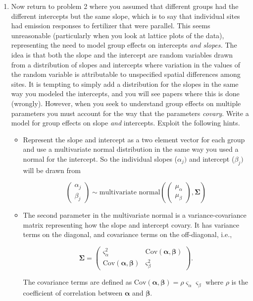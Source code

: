 \documentclass[12pt, oneside]{article}
\begin{document}
\begin{enumerate} [leftmargin=*]
\newpage

\item Now return to problem 2 where you assumed that different groups had the different intercepts but the same slope, which is to say that individual sites had emission responses to fertilizer that were parallel. This seems unreasonable (particularly when you look at lattice plots of the data), representing the need to model group effects on intercepts \emph{and slopes.} The idea is that both the slope and the intercept are random variables drawn from a distribution of slopes and intercepts where variation in the values of the random variable is attributable to unspecified spatial differences among sites. It is tempting to simply add a distribution for the slopes
in the same way you modeled the intercepts, and you will see papers where this is done (wrongly). However, when you seek to understand group effects on multiple parameters you must account for the way that the parameters \emph{covary}. Write a model for group effects on slope \emph{and} intercepts. Exploit the following hints.

\begin{itemize}
\item Represent the slope and intercept as a two element vector for each group and use a multivariate normal distribution in the same way you used a normal for the intercept. So the individual slopes ($\alpha_{j})$ and intercept ($\beta_{j})$ will be drawn from 

\begin{equation*}
\left(\begin{array}{c}
\alpha_{j}\\
\beta_{j}
\end{array}\right)\sim\text{multivariate normal}\left(\left(\begin{array}{c}
\mu_{\alpha}\\
\mu_{\beta}
\end{array}\right),\bm{\Sigma}\right)
\end{equation*}
\vspace{5mm}

\item The second parameter in the multivariate normal is a variance-covariance matrix representing how the slope and intercept covary. It has variance terms on the diagonal, and covariance terms on the off-diagonal, i.e., 

\begin{equation*}
\bm{\Sigma}=\left(\begin{array}{cc}
\varsigma_{\alpha}^{2} & \text{Cov}(\bm{\alpha},\bm{\beta})\\
\text{Cov}(\bm{\alpha},\bm{\beta}) & \varsigma_{\beta}^{2}
\end{array}\right).
\end{equation*}
\vspace{5mm}

The covariance terms are defined as $\text{Cov}(\bm{\alpha},\bm{\beta})=\rho\varsigma_{\alpha}\varsigma_{\beta}$ where $\rho$ is the coefficient of correlation between $\bm{\alpha}$ and $\bm{\beta}$.
\end{itemize}
\end{enumerate}
\end{document}
